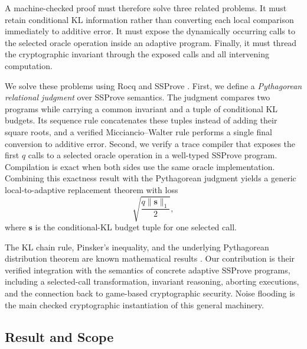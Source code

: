 A machine-checked proof must therefore solve three related problems. It must retain conditional KL information rather than converting each local comparison immediately to additive error. It must expose the dynamically occurring calls to the selected oracle operation inside an adaptive program. Finally, it must thread the cryptographic invariant through the exposed calls and all intervening computation.

We solve these problems using Rocq and SSProve \cite{ssprove}. First, we define a \emph{Pythagorean relational judgment} over SSProve semantics. The judgment compares two programs while carrying a common invariant and a tuple of conditional KL budgets. Its sequence rule concatenates these tuples instead of adding their square roots, and a verified Micciancio--Walter rule performs a single final conversion to additive error. Second, we verify a trace compiler that exposes the first $q$ calls to a selected oracle operation in a well-typed SSProve program. Compilation is exact when both sides use the same oracle implementation. Combining this exactness result with the Pythagorean judgment yields a generic local-to-adaptive replacement theorem with loss
\[
\sqrt{\frac{q\lVert\mathbf{s}\rVert_{1}}{2}},
\]
where $\mathbf{s}$ is the conditional-KL budget tuple for one selected call.

The KL chain rule, Pinsker's inequality, and the underlying Pythagorean distribution theorem are known mathematical results \cite{mw17}. Our contribution is their verified integration with the semantics of concrete adaptive SSProve programs, including a selected-call transformation, invariant reasoning, aborting executions, and the connection back to game-based cryptographic security. Noise flooding is the main checked cryptographic instantiation of this general machinery.

\subsection{Result and Scope}
\label{sec:intro-result-scope}
\label{sec:scope}

